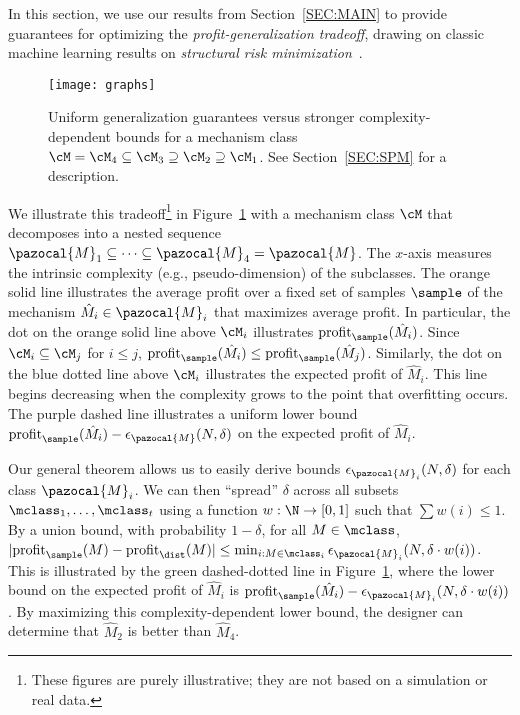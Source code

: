 In this section, we use our results from Section~\ref{SEC:MAIN} to provide guarantees for optimizing the \emph{profit-generalization tradeoff}, drawing on classic machine learning results on \emph{structural risk minimization}~\citep{Vapnik74:Theory,Blumer87:Occam}.
\begin{figure}
	\centering
	\texttt{[image: graphs]}
	\caption{Uniform generalization guarantees versus stronger complexity-dependent bounds for a mechanism class $\cM = \cM_4 \subseteq \cM_3 \supseteq \cM_2 \supseteq \cM_1$. See Section~\ref{SEC:SPM} for a description.}\label{fig:SPM}
\end{figure}
We illustrate this tradeoff\footnote{These figures are purely illustrative; they are not based on a simulation or real data.} in Figure~\ref{fig:SPM} with a mechanism class $\cM$ that decomposes into a nested sequence $\pazocal{M}_1 \subseteq \cdots \subseteq \pazocal{M}_4 = \pazocal{M}$.
The $x$-axis measures the intrinsic complexity (e.g., pseudo-dimension) of the subclasses. The orange solid line illustrates the average profit over a fixed set of samples $\sample$ of the mechanism $\hat{M}_i \in \pazocal{M}_i$ that maximizes average profit. In particular, the dot on the orange solid line above $\cM_i$ illustrates $\profit_{\sample}(\hat{M}_i)$. Since $\cM_i \subseteq \cM_j$ for $i \leq j$, $\profit_{\sample}(\hat{M}_i) \leq \profit_{\sample}(\hat{M}_j)$. Similarly, the dot on the blue dotted line above $\cM_i$ illustrates the expected profit of $\hat{M}_i$. This line begins decreasing when the complexity grows to the point that overfitting occurs. The purple dashed line illustrates a uniform lower bound $\profit_{\sample}(\hat{M}_i) - \epsilon_{\pazocal{M}}(N, \delta)$ on the expected profit of $\hat{M}_i$.

Our general theorem allows us to easily derive bounds $\epsilon_{\pazocal{M}_i}(N, \delta)$ for each class $\pazocal{M}_i$. We can then ``spread'' $\delta$ across all subsets $\mclass_1, \dots, \mclass_t$ using a function $w: \N \to [0,1]$ such that $\sum w(i) \leq 1$. By a union bound, with probability $1-\delta$, for all $M \in \mclass$, $|\profit_{\sample}(M) - \profit_{\dist}(M)| \leq \min_{i : M \in \mclass_i}  \epsilon_{\pazocal{M}_i}(N, \delta \cdot w(i))$.
This is illustrated by the green dashed-dotted line in Figure~\ref{fig:SPM}, where the lower bound on the expected profit of $\hat{M}_i$ is $\profit_{\sample}(\hat{M}_i) - \epsilon_{\pazocal{M}_i}(N, \delta \cdot w(i))$. By maximizing this complexity-dependent lower bound, the designer can determine that $\hat{M}_2$ is better than $\hat{M}_4$.

